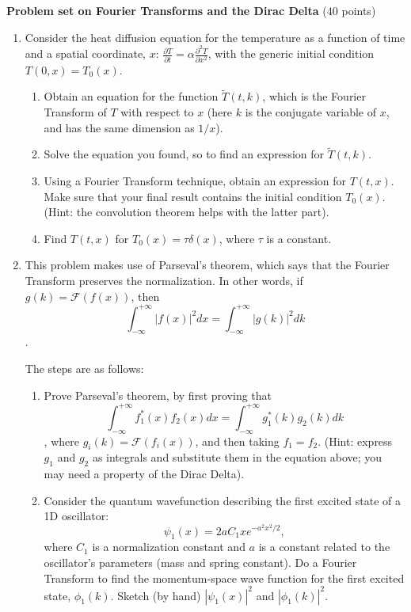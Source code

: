\documentclass[fleqn]{article}
\begin{document}

  \textbf{Problem set on Fourier Transforms and the Dirac Delta} (40 points)
  \begin{enumerate}

    \item Consider the heat diffusion equation for the temperature as a function of time and a spatial coordinate, $x$: $\frac{\partial T}{\partial t}=\alpha \frac{\partial^2 T}{\partial x^2}$, with the generic initial condition $T(0,x)=T_0(x)$. 
      \begin{enumerate}
        \item Obtain an  equation for the function $\tilde T(t,k)$, which is the Fourier Transform of $T$ with respect to $x$ (here $k$ is the conjugate variable of $x$, and  has the same dimension as $1/x$).
    
        \item Solve the equation you found, so to find an expression for $\tilde T(t,k)$. 
    
        \item Using a Fourier Transform technique, obtain an expression for $T(t,x)$. Make sure that your final result contains the initial condition $T_0(x)$. (Hint: the convolution theorem helps with the latter part). 
    
        \item Find $T(t,x)$ for  $T_0(x)=\tau \delta(x)$, where $\tau$ is a constant. 
      \end{enumerate}
     
    \item This problem makes use of Parseval's theorem, which says that the Fourier Transform preserves the normalization.  In other words, if $g(k) = {\mathcal F}(f(x))$, then $$\int^{+\infty}_{-\infty} |f(x)|^2 dx = \int^{+\infty}_{-\infty} |g(k)|^2 dk$$. 
     
    The steps are as follows:
      \begin{enumerate}
        \item Prove Parseval's theorem, by first proving that $$\int^{+\infty}_{-\infty} f^\ast_1(x)f_2(x) dx = \int^{+\infty}_{-\infty} g^\ast_1(k)g_2(k)dk$$, where $g_i(k) = {\mathcal F}(f_i(x))$, and then taking $f_1=f_2$. (Hint: express $g_1$ and $g_2$ as integrals and substitute them in the equation above; you may need a property of the Dirac Delta). 
    
    
        \item Consider the quantum wavefunction describing the first excited state of a 1D oscillator:
        \[
        \psi _{1}\left( x\right) =2aC_{1}xe^{-a^{2}x^{2}/2},
        \]
        where $C_{1}$ is a normalization constant and $a$ is a constant related to the oscillator's parameters (mass and spring constant).   Do a Fourier Transform to find the
        momentum-space wave function for the first excited state, $\phi _{1}\left(k\right)$. Sketch (by hand)  $|\psi _{1}\left( x\right)|^2$ and $|\phi _{1}\left(k\right)|^2$. 
    

\end{enumerate}
\end{enumerate}
\end{document}
